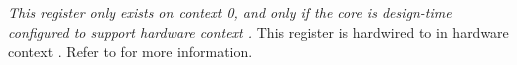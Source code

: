 
\emph{This register only exists on context 0, and only if the core is
design-time configured to support hardware context \n{}.} This register is 
hardwired to  in hardware context \n{}. Refer to  for more
information.


